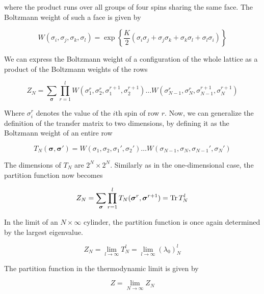 where the product runs over all groups of four spins sharing the same face. The Boltzmann weight of such a face is given by

\begin{equation}
  W(\sigma_i, \sigma_j, \sigma_k, \sigma_l) = \exp \left\{ \frac{K}{2} (\sigma_i \sigma_j + \sigma_j \sigma_k + \sigma_k \sigma_l + \sigma_l \sigma_i) \right\}
\end{equation}

We can express the Boltzmann weight of a configuration of the whole lattice as a product of the Boltzmann weights of the rows

\begin{equation}
  Z_N = \sum_{\bm{\sigma}} \prod_{r = 1}^{l} W(\sigma_{1}^{r}, \sigma_{2}^{r}, \sigma_{1}^{r+1}, \sigma_{2}^{r+1}) \dots W(\sigma_{N-1}^{r}, \sigma_{N}^{r}, \sigma_{N-1}^{r+1}, \sigma_{N}^{r+1})
\end{equation}

Where $\sigma_{i}^{r}$ denotes the value of the $i$th spin of row $r$. Now, we
can generalize the definition of the transfer matrix to two dimensions, by
defining it as the Boltzmann weight of an entire row

\begin{equation}\label{row_to_row_transfer_matrix} 
  T_{N}(\bm{\sigma}, \bm{\sigma'}) = W(\sigma_1, \sigma_2, \sigma_1', \sigma_2') \dots W(\sigma_{N-1}, \sigma_N, \sigma_{N-1}', \sigma_{N}')
\end{equation}

The dimensions of $T_N$ are $2^N \times 2^N$. Similarly as in the one-dimensional case, the partition function now becomes

\begin{equation}
  Z_N = \sum_{\bm{\sigma}} \prod_{r = 1}^{l} T_{N}(\bm{\sigma}^r, \bm{\sigma}^{r+1}) = \operatorname{Tr} T_{N}^l
\end{equation}

In the limit of an $N \times \infty$ cylinder, the partition function is once again determined by the largest eigenvalue.

\begin{equation}\label{largest_eigenvalue_transfer_matrix}
  Z_N = \lim_{l \to \infty} T_{N}^{l} = \lim_{l \to \infty} (\lambda_0)_{N}^{l}
\end{equation}

The partition function in the thermodynamic limit is given by

\begin{equation}
  Z = \lim_{N \to \infty} Z_N
\end{equation}


